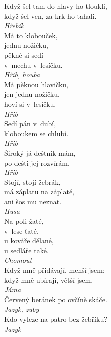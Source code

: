 \begin{multicols}{\value{columnsthindata}}
\noindent
Když šel tam do hlavy ho tloukli,\\
když šel ven, za krk ho tahali.\\[1 mm]
{\sl Hřebík}\\

\noindent
Má to klobouček,\\
jednu nožičku,\\
pěkně si sedí\\
v~mechu v~lesíčku.\\[1 mm]
{\sl Hřib, houba}\\

\noindent
Má pěknou hlavičku,\\
jen jednu nožičku,\\
hoví si v~lesíčku.\\[1 mm]
{\sl Hřib}\\

\noindent
Sedí pán v~dubí,\\
kloboukem se chlubí.\\[1 mm]
{\sl Hřib}\\

\noindent
Široký já deštník mám,\\
po dešti jej rozvírám.\\[1 mm]
{\sl Hřib}\\

\noindent
Stojí, stojí žebrák,\\
má záplatu na záplatě,\\
ani šos mu neznat.\\[1 mm]
{\sl Husa}\\

\noindent
Na poli žaté,\\
v~lese ťaté,\\
u kováře dělané,\\
u sedláře také.\\[1 mm]
{\sl Chomout}\\

\noindent
Když mně přidávají, menší jsem;\\
když mně ubírají, větší jsem.\\[1 mm]
{\sl Jáma}\\

\noindent
Červený beránek po ovčíně skáče.\\[1 mm]
{\sl Jazyk, zuby}\\

\noindent
Kdo vyleze na patro bez žebříku?\\[1 mm]
{\sl Jazyk}\\


\end{multicols}
